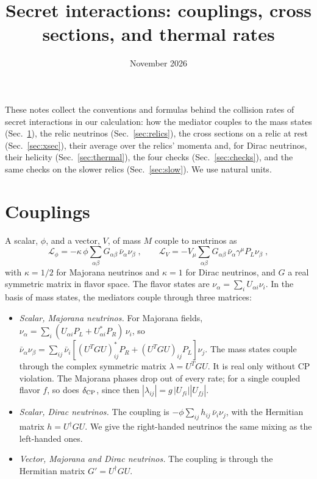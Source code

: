 \documentclass[11pt]{article}
\title{Secret interactions: couplings, cross sections, and thermal rates}
\author{}
\date{November 2026}
\begin{document}
\maketitle

\noindent
These notes collect the conventions and formulas behind the collision rates of secret interactions in our calculation: how the mediator couples to the mass states (Sec.~\ref{sec:couplings}), the relic neutrinos (Sec.~\ref{sec:relics}), the cross sections on a relic at rest (Sec.~\ref{sec:xsec}), their average over the relics' momenta and, for Dirac neutrinos, their helicity (Sec.~\ref{sec:thermal}), the four checks (Sec.~\ref{sec:checks}), and the same checks on the slower relics (Sec.~\ref{sec:slow}).
We use natural units.

\section{Couplings}
\label{sec:couplings}

A scalar, $\phi$, and a vector, $V$, of mass $M$ couple to neutrinos as
\begin{equation}
 \mathcal{L}_\phi = -\kappa\, \phi \sum_{\alpha\beta} G_{\alpha\beta}\, \bar\nu_\alpha \nu_\beta \;, \qquad
 \mathcal{L}_V = -V_\mu \sum_{\alpha\beta} G_{\alpha\beta}\, \bar\nu_\alpha \gamma^\mu P_L \nu_\beta \;,
\end{equation}
with $\kappa = 1/2$ for Majorana neutrinos and $\kappa = 1$ for Dirac neutrinos, and $G$ a real symmetric matrix in flavor space.
The flavor states are $\nu_\alpha = \sum_i U_{\alpha i} \nu_i$.
In the basis of mass states, the mediators couple through three matrices:
\begin{itemize}
 \item \textit{Scalar, Majorana neutrinos.}
 For Majorana fields, $\nu_\alpha = \sum_i (U_{\alpha i} P_L + U^\ast_{\alpha i} P_R)\, \nu_i$, so
 $\bar\nu_\alpha \nu_\beta = \sum_{ij} \bar\nu_i \left[ (U^T G U)^\ast_{ij} P_R + (U^T G U)_{ij} P_L \right] \nu_j$.
 The mass states couple through the complex symmetric matrix $\lambda = U^T G U$.
 It is real only without CP violation.
 The Majorana phases drop out of every rate; for a single coupled flavor $f$, so does $\delta_{\rm CP}$, since then $|\lambda_{ij}| = g\, |U_{fi}| |U_{fj}|$.
 \item \textit{Scalar, Dirac neutrinos.}
 The coupling is $-\phi \sum_{ij} h_{ij}\, \bar\nu_i \nu_j$, with the Hermitian matrix $h = U^\dagger G U$.
 We give the right-handed neutrinos the same mixing as the left-handed ones.
 \item \textit{Vector, Majorana and Dirac neutrinos.}
 The coupling is through the Hermitian matrix $G' = U^\dagger G U$.
\end{itemize}
\end{document}
